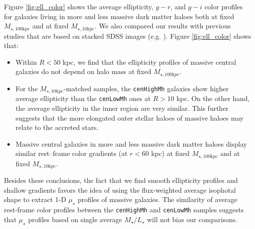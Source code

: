 \documentclass[a4paper,fleqn,usenatbib]{mnras}
\def\rbcg{\texttt{cenHighMh}}
\def\nbcg{\texttt{cenLowMh}}
\def\minn{{$M_{\star,10\mathrm{kpc}}$}}
\def\mtot{{$M_{\star,100\mathrm{kpc}}$}}
\def\m2l{{$M_{\star}/L_{\star}$}}
\def\mden{{$\mu_{\star}$}}
\begin{document}
    Figure \ref{fig:ell_color} shows the average ellipticity, $g-r$, and $g-i$ color 
    profiles for galaxies living in more and less massive dark matter haloes both at 
    fixed \mtot{} and at fixed \minn{}. 
    We also compared our results with previous studies that are based on stacked SDSS 
    images (e.g. \citealt{LaBarbera2010, Tal2011, DSouza2014}). 
    Figure \ref{fig:ell_color} shows that: 
    
    \begin{itemize}
        \item Within $R<50$ kpc, we find that the ellipticity profiles of massive 
            central galaxies do not depend on halo mass at fixed \mtot{}.        
                
        \item For the \minn{}-matched samples, the \rbcg{} galaxies show higher
            average ellipticity than the \nbcg{} ones at $R > 10$ kpc. 
            On the other hand, the average ellipticity in the inner region are very 
            similar. 
            This further suggests that the more elongated outer stellar haloes 
            of massive haloes may relate to the accreted stars.
                     
        \item Massive central galaxies in more and less massive dark matter haloes 
            display similar rest--frame color gradients (at $r<60$ kpc) at fixed 
            \mtot{} and at fixed  \minn{}.    
            
    \end{itemize}
    
    Besides these conclusions, the fact that we find smooth ellipticity profiles and 
    shallow gradients favors the idea of using the flux-weighted average isophotal 
    shape to extract 1-D \mden{} profiles of massive galaxies. 
    The similarity of average rest-frame color profiles between the \rbcg{} and \nbcg{}
    samples suggests that \mden{} profiles based on single average \m2l{} will not bias 
    our comparisons. 
    
   

\end{document}
